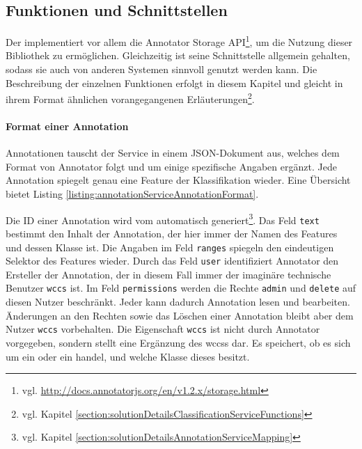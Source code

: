 \subsection{Funktionen und Schnittstellen}
    \label{section:solutionDetailsAnnotationServiceFunctions}
    Der {\annotationService} implementiert vor allem die
    Annotator Storage API\footnote{vgl. \url{http://docs.annotatorjs.org/en/v1.2.x/storage.html}},
    um die Nutzung dieser Bibliothek zu ermöglichen.
    Gleichzeitig ist seine Schnittstelle allgemein gehalten,
    sodass sie auch von anderen Systemen sinnvoll genutzt werden kann.
    Die Beschreibung der einzelnen Funktionen erfolgt in diesem Kapitel und
    gleicht in ihrem Format ähnlichen vorangegangenen
    Erläuterungen\footnote{vgl. Kapitel \ref{section:solutionDetailsClassificationServiceFunctions}}.

    \paragraph{Format einer Annotation}
    Annotationen tauscht der Service in einem JSON-Dokument aus,
    welches dem Format von Annotator folgt und um einige spezifische Angaben ergänzt.
    Jede Annotation spiegelt genau eine Feature der Klassifikation wieder.
    Eine Übersicht bietet Listing \ref{listing:annotationServiceAnnotationFormat}.

    

    Die ID einer Annotation wird vom {\annotationService} automatisch
    generiert\footnote{vgl. Kapitel \ref{section:solutionDetailsAnnotationServiceMapping}}.
    Das Feld \texttt{text} bestimmt den Inhalt der Annotation,
    der hier immer der Namen des Features und dessen Klasse ist.
    Die Angaben im Feld \texttt{ranges} spiegeln den eindeutigen Selektor des Features wieder.
    Durch das Feld \texttt{user} identifiziert Annotator den Ersteller der Annotation,
    der in diesem Fall immer der imaginäre technische Benutzer \texttt{wccs} ist.
    Im Feld \texttt{permissions} werden die Rechte \texttt{admin} und \texttt{delete} auf diesen Nutzer beschränkt.
    Jeder kann dadurch Annotation lesen und bearbeiten.
    Änderungen an den Rechten sowie das Löschen einer Annotation bleibt aber dem Nutzer \texttt{wccs} vorbehalten.
    Die Eigenschaft \texttt{wccs} ist nicht durch Annotator vorgegeben,
    sondern stellt eine Ergänzung des \glspl{wccs} dar.
    Es speichert, ob es sich um ein {\contentFeature} oder ein {} handel,
    und welche Klasse dieses besitzt.

